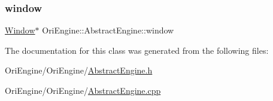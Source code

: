 \hypertarget{class_ori_engine_1_1_abstract_engine_a19fb6e3400090763c2459f7ee412ca14}{}\label{class_ori_engine_1_1_abstract_engine_a19fb6e3400090763c2459f7ee412ca14} 
\subsubsection{\texorpdfstring{window}{window}}
{\footnotesize\ttfamily \hyperlink{class_ori_engine_1_1_window}{Window}$\ast$ Ori\+Engine\+::\+Abstract\+Engine\+::window\hspace{0.3cm}{\ttfamily [private]}}



The documentation for this class was generated from the following files\+:\begin{DoxyCompactItemize}
\item 
Ori\+Engine/\+Ori\+Engine/\hyperlink{_abstract_engine_8h}{Abstract\+Engine.\+h}\item 
Ori\+Engine/\+Ori\+Engine/\hyperlink{_abstract_engine_8cpp}{Abstract\+Engine.\+cpp}\end{DoxyCompactItemize}
